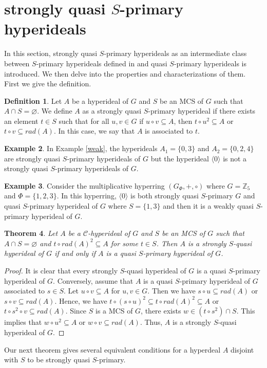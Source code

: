 \documentclass[preprint,review,10pt]{amsart}
\newtheorem{theorem}{Theorem}[section]
\theoremstyle{definition}
\newtheorem{definition}[theorem]{Definition}
\newtheorem{example}[theorem]{Example}
\theoremstyle{remark}
\numberwithin{equation}{section}
\begin{document}
\section{strongly quasi $S$-primary hyperideals}
In this section, strongly quasi $S$-primary hyperideals as an intermediate class between $S$-primary hyperideals defined in \cite{Ghiasvand3} and quasi $S$-primary hyperideals   is introduced. We then delve into the properties and characterizations of them. First we give the deﬁnition.
\begin{definition}
Let $A$ be a  hyperideal of $G$ and $S$ be an MCS of $G$ such that $A \cap S=\varnothing$. We define $A$ as a strongly quasi $S$-primary hyperideal if there exists an element  $t \in S$ such that for all $u,v \in G$ if $  u \circ v \subseteq A$, then $t \circ u^2 \subseteq A$ or $t \circ v \subseteq rad(A)$. In this case, we say that $A$ is associated to $t$.
\end{definition}
 \begin{example}
 In Example \ref{weak}, the hyperideals $A_1=\{0,3\}$ and $A_2=\{0,2,4\}$ are strongly quasi $S$-primary hyperideals of $G$ but the hyperideal $\langle 0 \rangle$ is not a strongly quasi $S$-primary hyperideals of $G$. 
 \end{example}
 \begin{example} \label{haji}
 Consider the multiplicative hyperring $(G_{\Phi},+,\circ)$ where $G=\mathbb{Z}_5$ and $\Phi=\{1,2,3\}$. In this hyperring, $\langle 0 \rangle$ is both strongly quasi $S$-primary $G$ and quasi $S$-primary hyperideal of $G$ where $S=\{1,3\}$ and then it is a weakly quasi $S$-primary hyperideal of $G$.
 \end{example}
 \begin{theorem} \label{41}
 Let $A$ be a   $\mathcal{C}$-hyperideal of $G$ and $S$ be an MCS of $G$ such that $A \cap S=\varnothing$ and $t \circ rad(A)^2 \subseteq A$ for some $t \in S$. Then $A$ is a strongly $S$-quasi hyperideal of $G$ if and only if $A$ is a quasi $S$-primary hyperideal of $G$.
 \end{theorem}
 \begin{proof}
 It is clear that every strongly $S$-quasi hyperideal of $G$ is a quasi $S$-primary hyperideal of $G$. Conversely, assume that $A$ is a quasi $S$-primary hyperideal of $G$ associated to $s \in S$. Let $u \circ v \subseteq A$ for $u,v \in G$. Then we have $s \circ u \subseteq rad(A)$ or $s \circ v \subseteq rad(A)$. Hence,  we have $t\circ (s \circ u)^2 \subseteq t \circ rad(A)^2 \subseteq A$ or $t \circ s^2 \circ v \subseteq rad(A)$. Since $S$ is a MCS of $G$, there exists $w \in (t \circ s^2) \cap S$. This implies that $w \circ u^2 \subseteq A$ or $w \circ v \subseteq rad(A)$. Thus, $A$ is a strongly $S$-quasi hyperideal of $G$.
 \end{proof}
 Our next theorem gives several equivalent conditions for a hyperdeal $A$ disjoint with $S$ to be strongly quasi $S$-primary.
\end{document}

